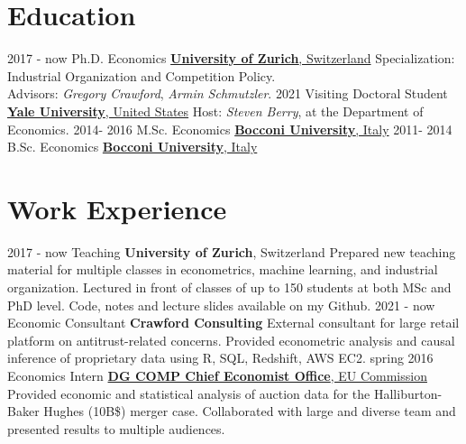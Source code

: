 \documentclass[a4paper]{mctemplate} %
\begin{document}

\begin{main}

\section{Education}

\begin{experiencelist} 
	\experienceitem
    	{2017 - now }
        {Ph.D. Economics}
        {\href{https://www.uzh.ch/en/}{\textbf{University of Zurich}, Switzerland}}
        {Specialization: Industrial Organization and Competition Policy. \\
         Advisors: \textit{Gregory Crawford}, \textit{Armin Schmutzler}.}
	\experienceitem
    	{2021}
        {Visiting Doctoral Student}
        {\href{https://www.yale.edu/}{\textbf{Yale University}, United States}}
        {Host: \textit{Steven Berry}, at the Department of Economics.}
    \experienceitem
    	{2014- 2016}
        {M.Sc. Economics}
        {\href{https://www.unibocconi.eu/}{\textbf{Bocconi University}, Italy}}
        {}
    \experienceitem
    	{2011- 2014}
        {B.Sc. Economics}
        {\href{https://www.unibocconi.eu/}{\textbf{Bocconi University}, Italy}}
        {}
\end{experiencelist}


\section{Work Experience}

\begin{experiencelist}
    \experienceitem
    	{2017 - now}
        {Teaching}
        {\textbf{University of Zurich}, Switzerland}
        {Prepared new teaching material for multiple classes in econometrics, machine learning, and industrial organization. Lectured in front of classes of up to 150 students at both MSc and PhD level. Code, notes and lecture slides available on my Github.
        }
	\experienceitem
    	{2021 - now}
        {Economic Consultant}
        {\textbf{Crawford Consulting}}
        {External consultant for large retail platform on antitrust-related concerns. Provided econometric analysis and causal inference of proprietary data using R, SQL, Redshift, AWS EC2.
        }
    \experienceitem
    	{spring 2016}
        {Economics Intern}
        {\href{https://ec.europa.eu/competition-policy/chief-competition-economist_en}{\textbf{DG COMP Chief Economist Office}, EU Commission}}
        {Provided economic and statistical analysis of auction data for the Halliburton-Baker Hughes (10B\$) merger case. Collaborated with large and diverse team and presented results to multiple audiences.
        }
\end{experiencelist}


\end{main}
\end{document}
